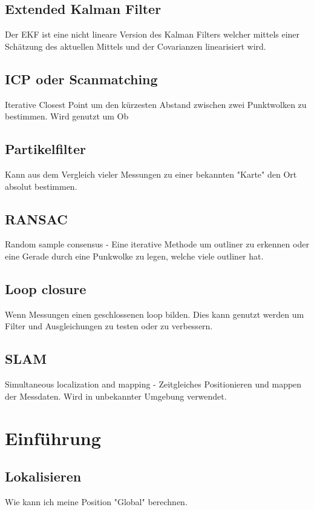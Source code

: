 \section{Extended Kalman Filter}
\label{uebersicht:sec:ExtendedKalmanFilter}
	Der EKF ist eine nicht lineare Version des Kalman Filters welcher mittels einer Schätzung des 
	aktuellen Mittels und der Covarianzen linearisiert wird.

\section{ICP oder Scanmatching}
\label{uebersicht:sec:ICPoderScanmatching}
	Iterative Closest Point um den kürzesten Abstand zwischen zwei Punktwolken zu bestimmen. Wird genutzt um Ob

\section{Partikelfilter}
\label{uebersicht:sec:Partikelfilter}
	Kann aus dem Vergleich vieler Messungen zu einer bekannten "Karte" den Ort absolut bestimmen.

\section{RANSAC}
\label{uebersicht:sec:RANSAC}
	Random sample consensus - Eine iterative Methode um outliner zu erkennen oder eine Gerade durch eine Punkwolke zu legen, welche viele outliner hat.

\section{Loop closure}
\label{uebersicht:sec:LoopClosure}
	Wenn Messungen einen geschlossenen loop bilden. Dies kann genutzt werden um Filter und Ausgleichungen zu testen oder zu verbessern.

\section{SLAM}
\label{uebersicht:sec:SLAM}
	Simultaneous localization and mapping - Zeitgleiches Positionieren und mappen der Messdaten. Wird in unbekannter Umgebung verwendet.
	
\chapter{Einführung}
\label{Einführung}	

\section{Lokalisieren}
\label{einfuehrung:sec:lokalisieren}
	Wie kann ich meine Position "Global" berechnen.
	
